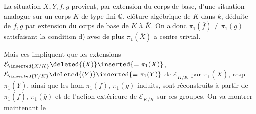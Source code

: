 
La situation $X,Y,f,g$ provient, par extension du corps de base, d'une situation analogue sur un corps $K$  de type fini  $\mathbb Q$.   clôture algébrique  de $K$ dans $k$,   déduite de  $f,g$ par extension du corps de base de $K$ à $\overline K$. On a donc $\pi_1(\overline f)\ne\pi_1(\overline g)$ satisfaisant la condition d) avec de plus $\pi_1(\overline X)$ a centre trivial.

Mais ces  impliquent que les extensions $\mathcal E_{\inserted{X/K}}\deleted{(X)}\inserted{=\pi_1(X)}$, $\mathcal E_{\inserted{Y/K}}\deleted{(Y)}\inserted{=\pi_1(Y)}$ de $\mathcal E_{\overline K/K}$ par $\pi_1(\overline X)$, resp. $\pi_1(\overline Y)$, ainsi que les hom $\pi_1(f)$, $\pi_1(g)$ induits, sont réconstruits à partir de  $\pi_1(\overline f)$, $\pi_1(\overline g)$ et de l'action extérieure de $\mathcal E_{\overline K/K}$ sur ces groupes. On va montrer maintenant le

